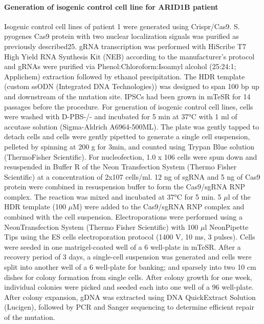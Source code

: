\paragraph{Generation of isogenic control cell line for ARID1B patient}
Isogenic control cell lines of patient 1 were generated using Crispr/Cas9. S. pyogenes Cas9 protein with two nuclear localization signals was purified as previously described25. gRNA transcription was performed with HiScribe T7 High Yield RNA Synthesis Kit (NEB) according to the manufacturer’s protocol and gRNAs were purified via Phenol:Chloroform:Isoamyl alcohol (25:24:1; Applichem) extraction followed by ethanol precipitation. The HDR template (custom ssODN (Integrated DNA Technologies)) was designed to span 100 bp up and downstream of the mutation site. IPSCs had been grown in mTeSR for 14 passages before the procedure. For generation of isogenic control cell lines, cells were washed with D-PBS-/- and incubated for 5 min at 37°C with 1 ml of accutase solution (Sigma-Aldrich A6964-500ML). The plate was gently tapped to detach cells and cells were gently pipetted to generate a single cell suspension, pelleted by spinning at 200 g for 3min, and counted using Trypan Blue solution (ThermoFisher Scientific). For nucleofection, 1.0 x 106 cells were spun down and resuspended in Buffer R of the Neon Transfection System (Thermo Fisher Scientific) at a concentration of 2x107 cells/ml. 12 ng of sgRNA and 5 ng of Cas9 protein were combined in resuspension buffer to form the Cas9/sgRNA RNP complex. The reaction was mixed and incubated at 37°C for 5 min. 5 $\mu$l of the HDR template (100 $\mu$M) were added to the Cas9/sgRNA RNP complex and combined with the cell suspension. Electroporations were performed using a Neon\textregistered Transfection System (Thermo Fisher Scientific) with 100 $\mu$l Neon\textregistered Pipette Tips using the ES cells electroporation protocol (1400 V, 10 ms, 3 pulses). Cells were seeded in one matrigel-coated well of a 6 well-plate in mTeSR. After a recovery period of 3 days, a single-cell suspension was generated and cells were split into another well of a 6 well-plate for banking; and sparsely into two 10 cm dishes for colony formation from single cells. After colony growth for one week, individual colonies were picked and seeded each into one well of a 96 well-plate. After colony expansion, gDNA was extracted using DNA QuickExtract Solution (Lucigen), followed by PCR and Sanger sequencing to determine efficient repair of the mutation. 


